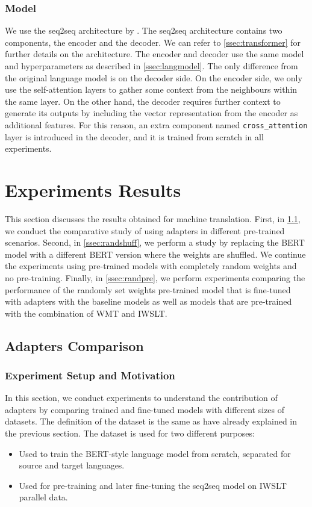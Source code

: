 \subsubsection{Model}
We use the seq2seq architecture by \cite{vaswani2017attention}. The seq2seq architecture contains two components, the encoder and the decoder. We can refer to \cref{ssec:transformer} for further details on the architecture. The encoder and decoder use the same model and hyperparameters as described in \cref{ssec:langmodel}. The only difference from the original language model is on the decoder side. On the encoder side, we only use the self-attention layers to gather some context from the neighbours within the same layer. On the other hand, the decoder requires further context to generate its outputs by including the vector representation from the encoder as additional features. For this reason, an extra component named \texttt{cross\_attention} layer is introduced in the decoder, and it is trained from scratch in all experiments.

\section{Experiments Results}
This section discusses the results obtained for machine translation. First, in \cref{ssec:adaptcomp}, we conduct the comparative study of using adapters in different pre-trained scenarios. Second, in \cref{ssec:randshuff}, we perform a study by replacing the BERT model with a different BERT version where the weights are shuffled. We continue the experiments using pre-trained models with completely random weights and no pre-training. Finally, in \cref{ssec:randpre}, we perform experiments comparing the performance of the randomly set weights pre-trained model that is fine-tuned with adapters with the baseline models as well as models that are pre-trained with the combination of WMT and IWSLT.

\subsection{Adapters Comparison}
\label{ssec:adaptcomp}
\subsubsection{Experiment Setup and Motivation}
In this section, we conduct experiments to understand the contribution of adapt\-ers by comparing trained and fine-tuned models with different sizes of datasets. The definition of the dataset is the same as have already explained in the previous section. The dataset is used for two different purposes:
\begin{itemize}
    \item Used to train the BERT-style language model from scratch, separated for source and target languages.
    \item Used for pre-training and later fine-tuning the seq2seq model on IWSLT parallel data.
\end{itemize}

